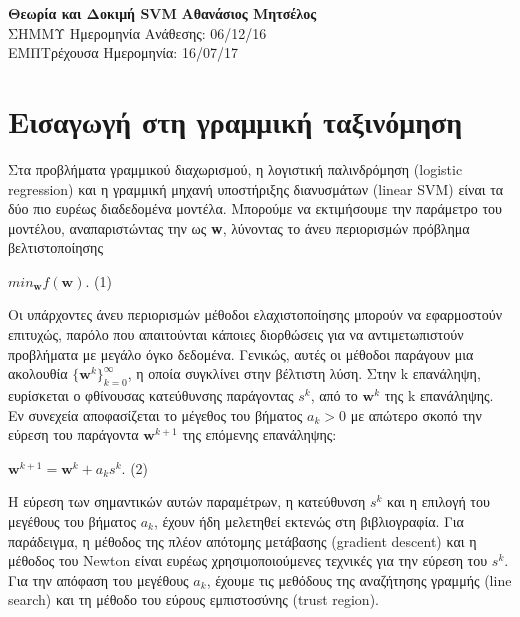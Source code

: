 \documentclass[a4paper, 11pt]{article}
\begin{document}
\noindent
\large\textbf{Θεωρία και Δοκιμή SVM} \hfill \textbf{Αθανάσιος Μητσέλος} \\
\normalsize ΣΗΜΜΥ \hfill Ημερομηνία Ανάθεσης: 06/12/16  \\
ΕΜΠ\hfill Τρέχουσα Ημερομηνία: 16/07/17 \\

\section{Εισαγωγή στη γραμμική ταξινόμηση}
Στα προβλήματα γραμμικού διαχωρισμού, η λογιστική παλινδρόμηση (logistic regression) και η γραμμική μηχανή υποστήριξης διανυσμάτων (linear SVM) είναι τα δύο πιο ευρέως διαδεδομένα μοντέλα. Μπορούμε να εκτιμήσουμε την παράμετρο του μοντέλου, αναπαριστώντας την ως \textbf{w}, λύνοντας το άνευ περιορισμών πρόβλημα βελτιστοποίησης\begin{center}
$min_\textbf{w}f(\textbf{w})$. (1)
\end{center}
Οι υπάρχοντες άνευ περιορισμών μέθοδοι ελαχιστοποίησης μπορούν να εφαρμοστούν επιτυχώς, παρόλο που απαιτούνται κάποιες διορθώσεις για να αντιμετωπιστούν προβλήματα με μεγάλο όγκο δεδομένα. Γενικώς, αυτές οι μέθοδοι παράγουν μια ακολουθία $\{\textbf{w}^k\}^\infty_{k=0}$, η οποία συγκλίνει στην βέλτιστη λύση. Στην k επανάληψη, ευρίσκεται ο φθίνουσας κατεύθυνσης παράγοντας $s^k$, από το $\textbf{w}^k$ της k επανάληψης. Εν συνεχεία αποφασίζεται το μέγεθος του βήματος $a_k>0$ με απώτερο σκοπό την εύρεση του παράγοντα $\textbf{w}^{k+1}$ της επόμενης επανάληψης:
\begin{center}
$\textbf{w}^{k+1}=\textbf{w}^k+a_k s^k$. (2)
\end{center} 
Η εύρεση των σημαντικών αυτών παραμέτρων, η κατεύθυνση $s^k$ και η επιλογή του μεγέθους του βήματος $a_k$, έχουν ήδη μελετηθεί εκτενώς στη βιβλιογραφία. Για παράδειγμα, η μέθοδος της πλέον απότομης μετάβασης (gradient descent) και η μέθοδος του Newton είναι ευρέως χρησιμοποιούμενες τεχνικές για την εύρεση του $s^k$. Για την απόφαση του μεγέθους $a_k$, έχουμε τις μεθόδους της αναζήτησης γραμμής (line search) και τη μέθοδο του εύρους εμπιστοσύνης (trust region).
\end{document}

